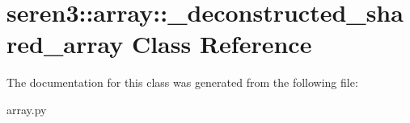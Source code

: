 \hypertarget{classseren3_1_1array_1_1__deconstructed__shared__array}{
\section{seren3::array::\_\-deconstructed\_\-shared\_\-array Class Reference}
\label{classseren3_1_1array_1_1__deconstructed__shared__array}
}


The documentation for this class was generated from the following file:\begin{DoxyCompactItemize}
\item 
array.py\end{DoxyCompactItemize}
